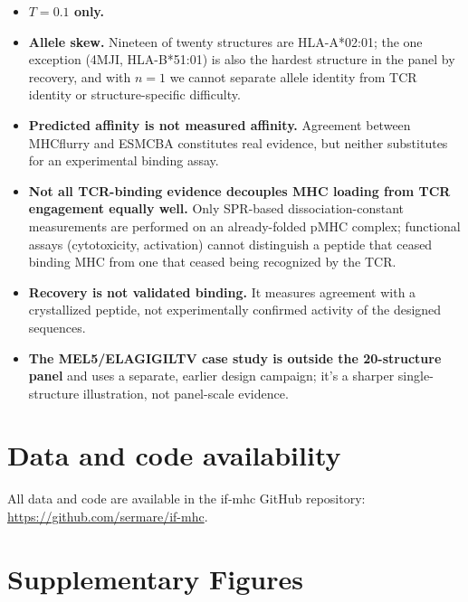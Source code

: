 \documentclass[letterpaper]{article}
\begin{document}
\begin{itemize}
\item \textbf{$T{=}0.1$ only.}
\item \textbf{Allele skew.} Nineteen of twenty structures are HLA-A*02:01; the one exception (4MJI,
HLA-B*51:01) is also the hardest structure in the panel by recovery, and with $n=1$ we cannot separate
allele identity from TCR identity or structure-specific difficulty.
\item \textbf{Predicted affinity is not measured affinity.} Agreement between MHCflurry and ESMCBA
constitutes real evidence, but neither substitutes for an experimental binding assay.
\item \textbf{Not all TCR-binding evidence decouples MHC loading from TCR engagement equally well.} Only
SPR-based dissociation-constant measurements are performed on an already-folded pMHC complex; functional
assays (cytotoxicity, activation) cannot distinguish a peptide that ceased binding MHC from one that
ceased being recognized by the TCR.
\item \textbf{Recovery is not validated binding.} It measures agreement with a crystallized peptide, not
experimentally confirmed activity of the designed sequences.
\item \textbf{The MEL5/ELAGIGILTV case study is outside the 20-structure panel} and uses a separate,
earlier design campaign; it's a sharper single-structure illustration, not panel-scale evidence.
\end{itemize}

\section{Data and code availability}
\label{sec:data}

All data and code are available in the if-mhc GitHub repository:
\url{https://github.com/sermare/if-mhc}.

\FloatBarrier
\appendix
\section{Supplementary Figures}
\end{document}
